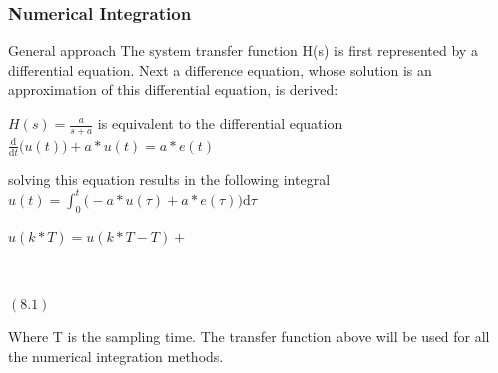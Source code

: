 \begin{frame}
	\frametitle{Numerical Integration}
	\begin{block}{General approach}
		The system transfer function H(s) is first represented by a differential equation. Next a difference equation, whose solution is an approximation of this differential equation, is derived: 
		\begin{center}
			$H(s) = \frac{a}{s + a}$
			is equivalent to the differential equation
			$\frac{\mathrm d}{\mathrm d t} \big( u(t) \big) + a*u(t) = a*e(t)$
			
			solving this equation results in the following integral
			$u(t) = \int_0^t \big(-a*u(\tau) + a*e(\tau) \big)\mathrm{d}\tau$
			
			$u(k*T) = u(k*T - T)+ $ \begin{cases}
				\\
			\end{cases}
			$(8.1)$
		\end{center}
		Where T is the sampling time. The transfer function above will be used for all the numerical integration methods.
	\end{block}
\end{frame}

